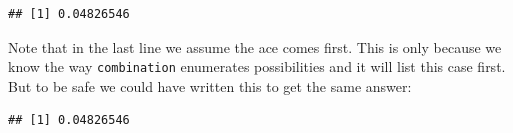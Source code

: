 \documentclass[
  openany]{book}
\newenvironment{Shaded}{\begin{snugshade}}{\end{snugshade}}
\newcommand{\DataTypeTok}[1]{\textcolor[rgb]{0.13,0.29,0.53}{#1}}
\newcommand{\DecValTok}[1]{\textcolor[rgb]{0.00,0.00,0.81}{#1}}
\newcommand{\KeywordTok}[1]{\textcolor[rgb]{0.13,0.29,0.53}{\textbf{#1}}}
\newcommand{\NormalTok}[1]{#1}
\newcommand{\OperatorTok}[1]{\textcolor[rgb]{0.81,0.36,0.00}{\textbf{#1}}}
\newcommand{\StringTok}[1]{\textcolor[rgb]{0.31,0.60,0.02}{#1}}
\begin{document}
\begin{Shaded}
\end{Shaded}

\begin{verbatim}
## [1] 0.04826546
\end{verbatim}

Note that in the last line we assume the ace comes first. This is only because we know the way \texttt{combination} enumerates possibilities and it will list this case first. But to be safe we could have written this to get the same answer:

\begin{Shaded}
\end{Shaded}

\begin{verbatim}
## [1] 0.04826546
\end{verbatim}
\end{document}
